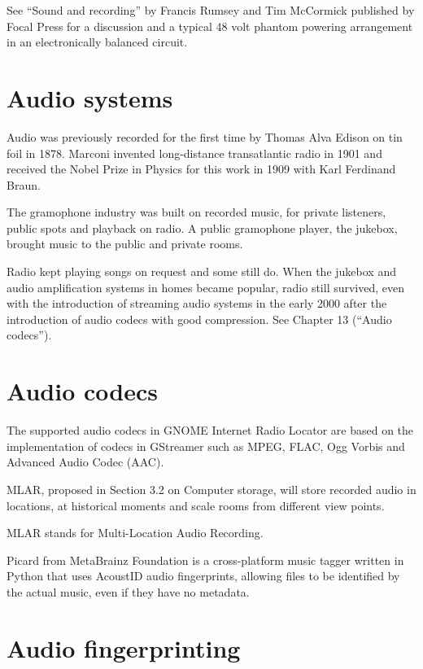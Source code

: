 \documentclass[a4paper,norsk,utf8]{report}
\begin{document}
    See ``Sound and recording'' by Francis Rumsey and Tim McCormick
    published by Focal Press for a discussion and a typical 48 volt
    phantom powering arrangement in an electronically balanced
    circuit.

\chapter{Audio systems}

    Audio was previously recorded for the first time by Thomas Alva
    Edison on tin foil in 1878.  Marconi invented long-distance
    transatlantic radio in 1901 and received the Nobel Prize in
    Physics for this work in 1909 with Karl Ferdinand Braun.

    The gramophone industry was built on recorded music, for private
    listeners, public spots and playback on radio.  A public
    gramophone player, the jukebox, brought music to the public and
    private rooms.

    Radio kept playing songs on request and some still do.
    When the jukebox and audio amplification systems in homes
    became popular, radio still survived, even with the introduction
    of streaming audio systems in the early 2000 after the introduction
    of audio codecs with good compression.  See Chapter 13 (``Audio codecs'').

\chapter{Audio codecs}

    The supported audio codecs in GNOME Internet Radio Locator are
    based on the implementation of codecs in GStreamer such as MPEG,
    FLAC, Ogg Vorbis and Advanced Audio Codec (AAC).

    MLAR, proposed in Section 3.2 on Computer storage, will store
    recorded audio in locations, at historical moments and scale rooms
    from different view points.

    MLAR stands for Multi-Location Audio Recording.

    Picard from MetaBrainz Foundation is a cross-platform music tagger
    written in Python that uses AcoustID audio fingerprints, allowing
    files to be identified by the actual music, even if they have no
    metadata.

\chapter{Audio fingerprinting}
\end{document}
